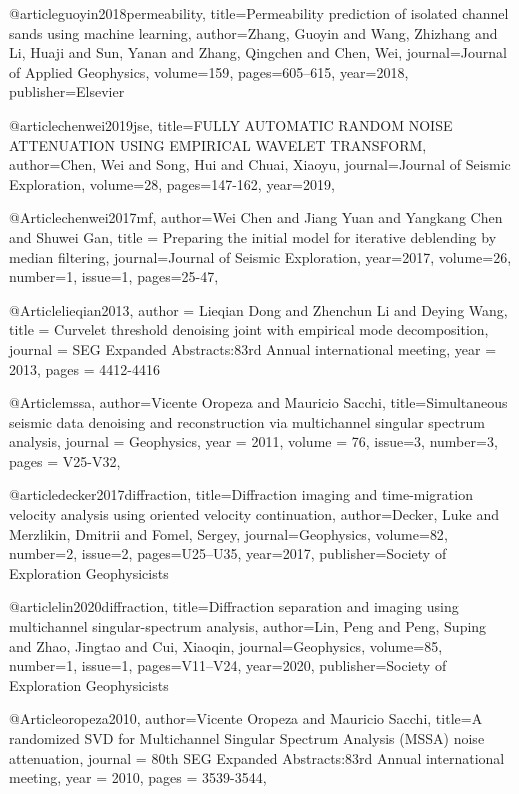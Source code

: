 @article{guoyin2018permeability,
  title={Permeability prediction of isolated channel sands using machine learning},
  author={Zhang, Guoyin and Wang, Zhizhang and Li, Huaji and Sun, Yanan and Zhang, Qingchen and Chen, Wei},
  journal={Journal of Applied Geophysics},
  volume={159},
  pages={605--615},
  year={2018},
  publisher={Elsevier}
}

@article{chenwei2019jse,
  title={FULLY AUTOMATIC RANDOM NOISE ATTENUATION USING EMPIRICAL WAVELET TRANSFORM},
  author={Chen, Wei and Song, Hui and Chuai, Xiaoyu},
  journal={Journal of Seismic Exploration},
  volume={28},
  pages={147-162},
  year={2019},
}

@Article{chenwei2017mf,
  author={Wei Chen and Jiang Yuan and Yangkang Chen and Shuwei Gan},
  title = {Preparing the initial model for iterative deblending by median filtering},
  journal={Journal of Seismic Exploration},
  year=2017,
  volume=26,
  number=1,
  issue=1,
  pages={25-47},
}

@Article{lieqian2013,
  author = 	 {Lieqian Dong and Zhenchun Li and Deying Wang},
  title = 	 {Curvelet threshold denoising joint with empirical mode decomposition},
  journal = 	 {SEG Expanded Abstracts:83rd Annual international meeting},
  year = 	 2013,
  pages =	 {4412-4416}
}



@Article{mssa,
  author={Vicente Oropeza and Mauricio Sacchi},
  title={Simultaneous seismic data denoising and reconstruction via multichannel singular spectrum analysis},
  journal = 	 {Geophysics},
  year = 	 2011,
  volume =	 76,
    issue=3,
    number=3,
  pages =	 {V25-V32},
}

@article{decker2017diffraction,
  title={Diffraction imaging and time-migration velocity analysis using oriented velocity continuation},
  author={Decker, Luke and Merzlikin, Dmitrii and Fomel, Sergey},
  journal={Geophysics},
  volume={82},
  number={2},
  issue=2,
  pages={U25--U35},
  year={2017},
  publisher={Society of Exploration Geophysicists}
}


@article{lin2020diffraction,
  title={Diffraction separation and imaging using multichannel singular-spectrum analysis},
  author={Lin, Peng and Peng, Suping and Zhao, Jingtao and Cui, Xiaoqin},
  journal={Geophysics},
  volume={85},
  number={1},
  issue=1,
  pages={V11--V24},
  year={2020},
  publisher={Society of Exploration Geophysicists}
}

@Article{oropeza2010,
  author={Vicente Oropeza and Mauricio Sacchi},
  title={A randomized SVD for Multichannel Singular Spectrum Analysis (MSSA) noise attenuation},
  journal = 	 {80th SEG Expanded Abstracts:83rd Annual international meeting},
  year = 	 2010,
  pages =	 {3539-3544},
}


